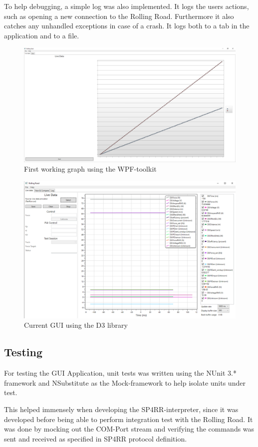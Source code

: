 To help debugging, a simple log was also implemented. It logs the users actions, such as opening a new connection to the Rolling Road. Furthermore it also catches any unhandled exceptions in case of a crash. It logs both to a tab in the application and to a file.

\begin{figure}[h!]
\centering
\includegraphics[width=0.7\linewidth]{SubPages/Images/First_GUI}
\caption{First working graph using the WPF-toolkit}
\label{fig:First_GUI}
\end{figure}

\begin{figure}[h!]
\centering
\includegraphics[width=0.7\linewidth]{SubPages/Images/Current_GUI}
\caption{Current GUI using the D3 library}
\label{fig:Current_GUI}
\end{figure}


\subsection{Testing}
For testing the GUI Application, unit tests was written using the NUnit 3.* framework and NSubstitute as the Mock-framework to help isolate units under test.

This helped immensely when developing the SP4RR-interpreter, since it was developed before being able to perform integration test with the Rolling Road. It was done by mocking out the COM-Port stream and verifying the commands was sent and received as specified in SP4RR  protocol definition\cite{RR}.

